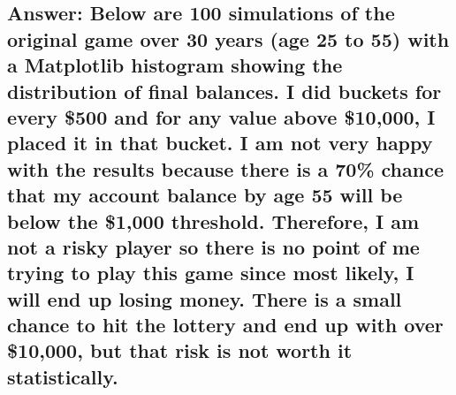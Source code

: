 \documentclass[
  letterpaper,
  DIV=11,
  numbers=noendperiod]{scrartcl}
\theoremstyle{definition}
\theoremstyle{remark}
\begin{document}
\subsection{Answer: Below are 100 simulations of the original game over
30 years (age 25 to 55) with a Matplotlib histogram showing the
distribution of final balances. I did buckets for every \$500 and for
any value above \$10,000, I placed it in that bucket. I am not very
happy with the results because there is a 70\% chance that my account
balance by age 55 will be below the \$1,000 threshold. Therefore, I am
not a risky player so there is no point of me trying to play this game
since most likely, I will end up losing money. There is a small chance
to hit the lottery and end up with over \$10,000, but that risk is not
worth it
statistically.}\label{answer-below-are-100-simulations-of-the-original-game-over-30-years-age-25-to-55-with-a-matplotlib-histogram-showing-the-distribution-of-final-balances.-i-did-buckets-for-every-500-and-for-any-value-above-10000-i-placed-it-in-that-bucket.-i-am-not-very-happy-with-the-results-because-there-is-a-70-chance-that-my-account-balance-by-age-55-will-be-below-the-1000-threshold.-therefore-i-am-not-a-risky-player-so-there-is-no-point-of-me-trying-to-play-this-game-since-most-likely-i-will-end-up-losing-money.-there-is-a-small-chance-to-hit-the-lottery-and-end-up-with-over-10000-but-that-risk-is-not-worth-it-statistically.}
\end{document}
